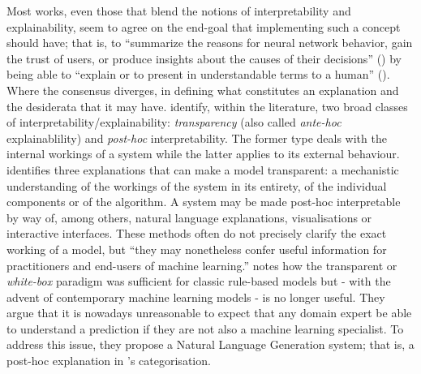 Most works, even those that blend the notions of interpretability and explainability, seem to agree on the end-goal that implementing such a concept should have; that is, to \enquote{summarize the reasons for neural network behavior, gain the trust of users, or produce insights about the causes of their decisions} (\cite{gilpin2018explaining}) by being able to \enquote{explain or to present in understandable terms to a human} (\cite{doshi2017towards}).
Where the consensus diverges, in defining what constitutes an explanation and the desiderata that it may have.
\cite{mittelstadt2019explaining} identify, within the literature, two broad classes of interpretability/explainability: \textit{transparency} (also called \textit{ante-hoc} explainablility) and \textit{post-hoc} interpretability.
The former type deals with the internal workings of a system while the latter applies to its external behaviour.
\cite{Lipton2016} identifies three explanations that can make a model transparent: a mechanistic understanding of the workings of the system in its entirety, of the individual components or of the algorithm.
A system may be made post-hoc interpretable by way of, among others, natural language explanations, visualisations or interactive interfaces.
These methods often do not precisely clarify the exact working of a model, but \enquote{they may nonetheless confer useful information for practitioners and end-users of machine learning.}
\cite{Biran2017} notes how the transparent or \textit{white-box} paradigm was sufficient for classic rule-based models but - with the advent of contemporary machine learning models - is no longer useful.
They argue that it is nowadays unreasonable to expect that any domain expert be able to understand a prediction if they are not also a machine learning specialist.
To address this issue, they propose a Natural Language Generation system; that is, a post-hoc explanation in \cite{Lipton2016}'s categorisation.

